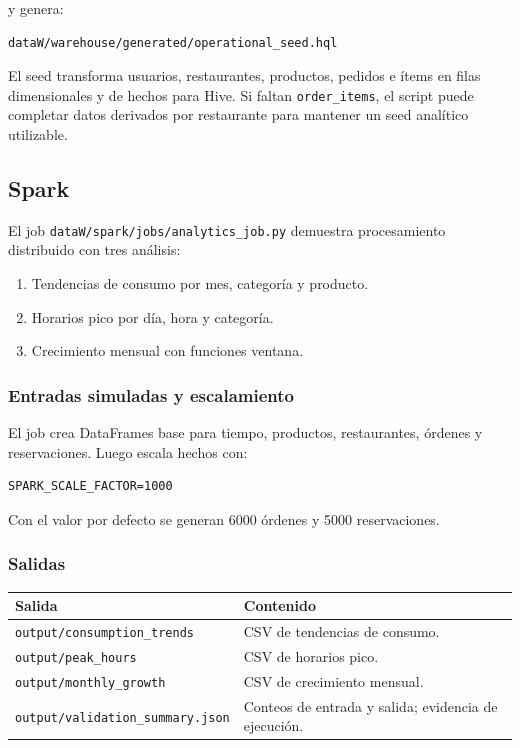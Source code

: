 \documentclass[12pt,letterpaper]{article}
\def\codefile#1{\nolinkurl{#1}}
\begin{document}
y genera:

\begin{lstlisting}
dataW/warehouse/generated/operational_seed.hql
\end{lstlisting}

El seed transforma usuarios, restaurantes, productos, pedidos e ítems en filas dimensionales y de hechos para Hive. Si faltan \codefile{order\_items}, el script puede completar datos derivados por restaurante para mantener un seed analítico utilizable.

\subsection{Spark}

El job \codefile{dataW/spark/jobs/analytics\_job.py} demuestra procesamiento distribuido con tres análisis:

\begin{enumerate}
    \item Tendencias de consumo por mes, categoría y producto.
    \item Horarios pico por día, hora y categoría.
    \item Crecimiento mensual con funciones ventana.
\end{enumerate}

\subsubsection{Entradas simuladas y escalamiento}

El job crea DataFrames base para tiempo, productos, restaurantes, órdenes y reservaciones. Luego escala hechos con:

\begin{lstlisting}
SPARK_SCALE_FACTOR=1000
\end{lstlisting}

Con el valor por defecto se generan 6000 órdenes y 5000 reservaciones.

\subsubsection{Salidas}

\begin{longtable}{p{}p{}}
\toprule
\textbf{Salida} & \textbf{Contenido}\\
\midrule
\codefile{output/consumption\_trends} & CSV de tendencias de consumo.\\
\codefile{output/peak\_hours} & CSV de horarios pico.\\
\codefile{output/monthly\_growth} & CSV de crecimiento mensual.\\
\codefile{output/validation\_summary.json} & Conteos de entrada y salida; evidencia de ejecución.\\
\bottomrule
\end{longtable}
\end{document}
